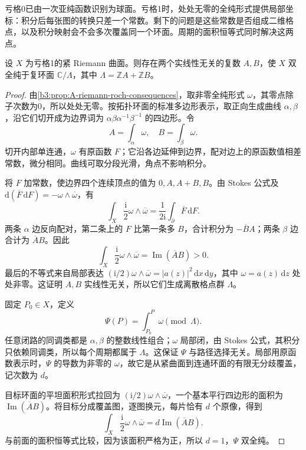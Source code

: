 亏格0已由一次亚纯函数识别为球面。亏格1时，处处无零的全纯形式提供局部坐标：积分后每张图的转换只差一个常数。剩下的问题是这些常数是否组成二维格点，以及积分映射会不会多次覆盖同一个环面。周期的面积恒等式同时解决这两点。

\begin{proposition}[亏格一曲面的周期格点]\label{b3:prop:A-genus-one-torus}
设 \(X\) 为亏格1的紧 Riemann 曲面。则存在两个实线性无关的复数 \(A,B\)，使 \(X\) 双全纯于复环面 \(\mathbb C/\Lambda\)，其中 \(\Lambda=\mathbb ZA+\mathbb ZB\)。
\end{proposition}
\begin{proof}
由\cref{b3:prop:A-riemann-roch-consequences}，取非零全纯形式 \(\omega\)，其零点除子次数为0，所以处处无零。按拓扑环面的标准多边形表示，取正向生成曲线 \(\alpha,\beta\)，沿它们切开成为边界词为 \(\alpha\beta\alpha^{-1}\beta^{-1}\) 的四边形。令
\[
 A=\int_\alpha\omega,\quad B=\int_\beta\omega.
\]
切开内部单连通，\(\omega\) 有原函数 \(F\)；它沿各边延伸到边界，配对边上的原函数值相差常数，微分相同。曲线可取分段光滑，角点不影响积分。

将 \(F\) 加常数，使边界四个连续顶点的值为 \(0,A,A+B,B\)。由 Stokes 公式及
\(\mathrm{d}(\overline F\,\mathrm{d}F)=-\omega\wedge\overline\omega\)，有
\[
 \int_X\frac{\mathrm{i}}2\omega\wedge\overline\omega
 =\frac1{2\mathrm{i}}\int_{\partial}\overline F\,\mathrm{d}F.
\]
两条 \(\alpha\) 边反向配对，第二条上的 \(F\) 比第一条多 \(B\)，合计积分为 \(-\overline B A\)；两条 \(\beta\) 边合计为 \(\overline A B\)。因此
\[
 \int_X\frac{\mathrm{i}}2\omega\wedge\overline\omega
 =\operatorname{Im}(\overline A B)>0.
\]
最后的不等式来自局部表达 \((\mathrm{i}/2)\omega\wedge\overline\omega=|a(z)|^2\,\mathrm{d}x\,\mathrm{d}y\)，其中 \(\omega=a(z)\,\mathrm{d}z\) 处处非零。这证明 \(A,B\) 实线性无关，所以它们生成离散格点群 \(\Lambda\)。

固定 \(P_0\in X\)，定义
\[
 \Psi(P)=\int_{P_0}^P\omega\pmod\Lambda.
\]
任意闭路的同调类都是 \(\alpha,\beta\) 的整数线性组合；\(\omega\) 局部闭，由 Stokes 公式，其积分只依赖同调类，所以每个周期都属于 \(\Lambda\)。这保证 \(\Psi\) 与路径选择无关。局部用原函数表示时，\(\Psi\) 的导数为非零的 \(\omega\)，故它是从紧曲面到连通环面的有限无分歧覆盖，记次数为 \(d\)。

目标环面的平坦面积形式拉回为 \((\mathrm{i}/2)\omega\wedge\overline\omega\)，一个基本平行四边形的面积为 \(\operatorname{Im}(\overline A B)\)。将目标分成覆盖图，逐图换元，每片恰有 \(d\) 个原像，得到
\[
 \int_X\frac{\mathrm{i}}2\omega\wedge\overline\omega
 =d\operatorname{Im}(\overline A B).
\]
与前面的面积恒等式比较，因为该面积严格为正，所以 \(d=1\)，\(\Psi\) 双全纯。
\end{proof}

